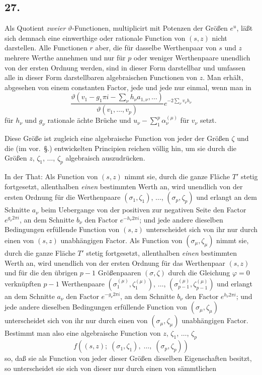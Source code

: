 \documentclass{article}
\begin{document}
\subsection*{27.}

Als Quotient \emph{zweier} $\vartheta$-Functionen, multiplicirt mit Potenzen der Größen $e^{u}$, läßt sich demnach eine einwerthige oder rationale Function von $(s, z)$ nicht darstellen. Alle Functionen $r$ aber, die für dasselbe Werthenpaar von $s$ und $z$ mehrere Werthe annehmen und nur für $p$ oder weniger Werthenpaare unendlich von der ersten Ordnung werden, sind in dieser Form darstellbar und umfassen alle in dieser Form darstellbaren algebraischen Functionen von $z$. Man erhält, abgesehen von einem constanten Factor, jede und jede nur einmal, wenn man in
\[ \frac{\vartheta\left(v_{1} - g_{1}\pi i - \displaystyle\sum_{\nu} h_{\nu} a_{1,\nu}, \ldots\right)}{\vartheta(v_{1}, \ldots, v_{p})} e^{-2 \sum_{\nu} v_{\nu} h_{\nu}} \]
für $h_{\nu}$ und $g_{\nu}$ rationale ächte Brüche und $u_{\nu} - \displaystyle\sum_{1}^{p} \alpha_{\nu}^{(\mu)}$ für $v_{\nu}$ setzt.

Diese Größe ist zugleich eine algebraische Function von jeder der Größen $\zeta$ und die (im vor.~§.) entwickelten Principien reichen völlig hin, um sie durch die Größen $z$, $\zeta_{1}$, $\ldots$, $\zeta_{p}$ algebraisch auszudrücken.

In der That: Als Function von $(s, z)$ nimmt sie, durch die ganze Fläche $T'$ stetig fortgesetzt, allenthalben \emph{einen} bestimmten Werth an, wird unendlich von der ersten Ordnung für die Werthenpaare $(\sigma_{1}, \zeta_{1})$, $\ldots$, $(\sigma_{p}, \zeta_{p})$ und erlangt an dem Schnitte $a_{\nu}$ beim Uebergange von der positiven zur negativen Seite den Factor $e^{g_{\nu} 2\pi i}$, an dem Schnitte $b_{\nu}$ den Factor $e^{-h_{\nu} 2\pi i}$; und jede andere dieselben Bedingungen erfüllende Function von $(s, z)$ unterscheidet sich von ihr nur durch einen von $(s, z)$ unabhängigen Factor. Als Function von $(\sigma_{\mu}, \zeta_{\mu})$ nimmt sie, durch die ganze Fläche $T'$ stetig fortgesetzt, allenthalben \emph{einen} bestimmten Werth an, wird unendlich von der ersten Ordnung für das Werthenpaar $(s, z)$ und für die den übrigen $p-1$ Größenpaaren $(\sigma, \zeta)$ durch die Gleichung $\varphi = 0$ verknüpften $p-1$ Werthenpaare $(\sigma_{1}^{(\mu)}, \zeta_{1}^{(\mu)})$, $\ldots$, $(\sigma_{p-1}^{(\mu)}, \zeta_{p-1}^{(\mu)})$ und erlangt an dem Schnitte $a_{\nu}$ den Factor $e^{-g_{\nu} 2\pi i}$, an dem Schnitte $b_{\nu}$ den Factor $e^{h_{\nu} 2\pi i}$; und jede andere dieselben Bedingungen erfüllende Function von $(\sigma_{\mu}, \zeta_{\mu})$ unterscheidet sich von ihr nur durch einen von $(\sigma_{\mu}, \zeta_{\mu})$ unabhängigen Factor. Bestimmt man also eine algebraische Function von $z$, $\zeta_{1}$, $\ldots$, $\zeta_{p}$
\[ f((s, z); \; (\sigma_{1}, \zeta_{1}), \; \ldots, \; (\sigma_{p}, \zeta_{p})) \]
so, daß sie als Function von jeder dieser Größen dieselben Eigenschaften besitzt, so unterscheidet sie sich von dieser nur durch einen von sämmtlichen
\end{document}
